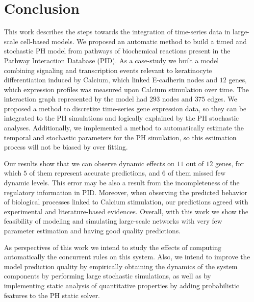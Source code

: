 \section{Conclusion}
This work describes the steps towards the integration of time-series data in large-scale cell-based models. 
We proposed an automatic method to build a timed and stochastic PH model from pathways of biochemical reactions present in 
the Pathway Interaction Database (PID). 
%
As a case-study we built a model combining signaling and transcription events relevant to keratinocyte differentiation induced by Calcium, which linked E-cadherin nodes and $12$ genes, which 
expression profiles was measured upon Calcium stimulation over time. The interaction graph represented by the model had $293$ nodes and $375$ edges.
%
We proposed a method to discretize time-series gene expression data, so they can be integrated to the PH simulations and logically explained by the PH stochastic analyses. 
%
Additionally, we implemented a method to automatically estimate the temporal and stochastic
parameters for the PH simulation, so this estimation process will not be biased by over fitting. 
%

Our results show that  we can observe dynamic effects on $11$ out of $12$ genes, for which $5$ of them represent accurate predictions, and $6$ of them missed few dynamic levels.
This error may be also a result from the incompleteness of the regulatory information in PID.
Moreover, when observing the predicted behavior of biological processes linked to Calcium stimulation, our predictions agreed with experimental and literature-based evidences.
Overall, with this work we show the feasibility of modeling and simulating large-scale networks with very few parameter estimation 
and having good quality predictions.

As perspectives of this work we intend to study the effects of computing automatically the concurrent rules on this system.
Also, we intend to improve the model prediction quality by empirically obtaining the dynamics of the system components by performing large stochastic simulations, as well 
as by implementing static analysis of quantitative properties by adding probabilistic features to the PH static solver.

